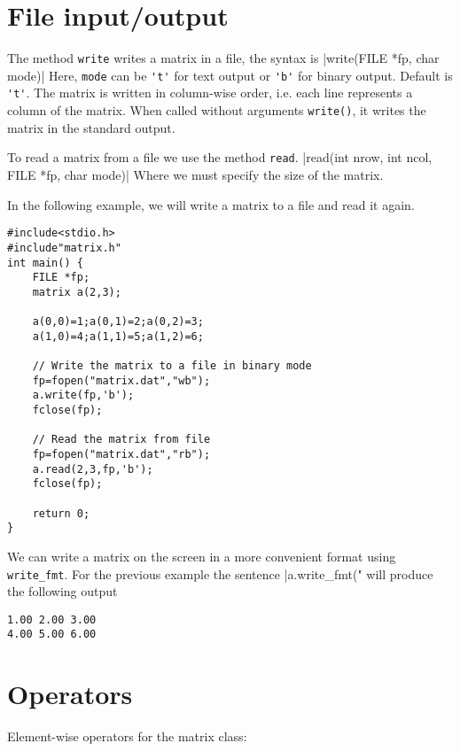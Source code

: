 \pagebreak

\section{File input/output}

The method {\tt write} writes a matrix in a file, the syntax is
|write(FILE *fp, char mode)|
Here, {\tt mode} can be \verb|'t'| for text output or \verb|'b'| for binary output. Default is \verb|'t'|.
The matrix is written in column-wise order, i.e. each line represents a column of the matrix.
When called without arguments \verb|write()|, it writes the matrix in the standard output.

To read a matrix from a file we use the method \verb|read|.
|read(int nrow, int ncol, FILE *fp, char mode)|
Where we must specify the size of the matrix.

In the following example, we will write a matrix to a file and read it again.
\begin{verbatim}
#include<stdio.h>
#include"matrix.h"
int main() {
	FILE *fp;
	matrix a(2,3);
	
	a(0,0)=1;a(0,1)=2;a(0,2)=3;
	a(1,0)=4;a(1,1)=5;a(1,2)=6;
	
	// Write the matrix to a file in binary mode
	fp=fopen("matrix.dat","wb");
	a.write(fp,'b');
	fclose(fp);
	
	// Read the matrix from file
	fp=fopen("matrix.dat","rb");
	a.read(2,3,fp,'b');
	fclose(fp);
		
	return 0;
}

\end{verbatim}

We can write a matrix on the screen in a more convenient format using \verb|write_fmt|. For the
previous example the sentence
|a.write_fmt("%
will produce the following output
\begin{verbatim}
1.00 2.00 3.00
4.00 5.00 6.00
\end{verbatim}

\pagebreak

\section{Operators}

Element-wise operators for the matrix class:

\medskip

